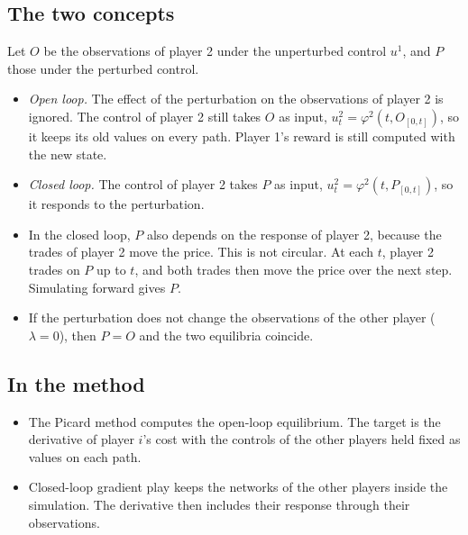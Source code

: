 \documentclass[11pt]{article}
\begin{document}
\subsection*{The two concepts}
Let $O$ be the observations of player 2 under the unperturbed control $u^1$, and $P$ those under the perturbed control.
\begin{itemize}[leftmargin=*]
  \item \textit{Open loop.} The effect of the perturbation on the observations of player 2 is ignored. The control of player 2 still takes $O$ as input, $u^2_t = \varphi^2(t, O_{[0,t]})$, so it keeps its old values on every path. Player 1's reward is still computed with the new state.
  \item \textit{Closed loop.} The control of player 2 takes $P$ as input, $u^2_t = \varphi^2(t, P_{[0,t]})$, so it responds to the perturbation.
  \item In the closed loop, $P$ also depends on the response of player 2, because the trades of player 2 move the price. This is not circular. At each $t$, player 2 trades on $P$ up to $t$, and both trades then move the price over the next step. Simulating forward gives $P$.
  \item If the perturbation does not change the observations of the other player ($\lambda = 0$), then $P = O$ and the two equilibria coincide.
\end{itemize}

\subsection*{In the method}
\begin{itemize}[leftmargin=*]
  \item The Picard method computes the open-loop equilibrium. The target is the derivative of player $i$'s cost with the controls of the other players held fixed as values on each path.
  \item Closed-loop gradient play keeps the networks of the other players inside the simulation. The derivative then includes their response through their observations.
\end{itemize}
\end{document}
